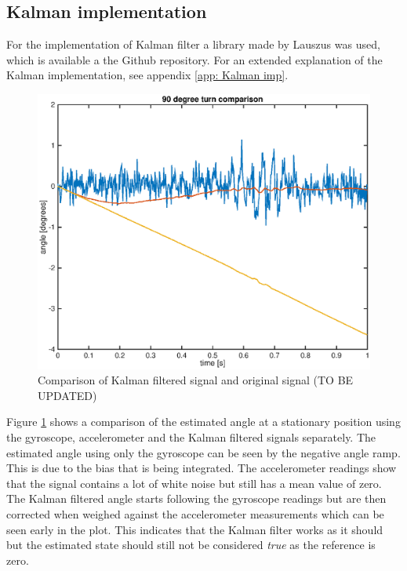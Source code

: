 \documentclass[a4paper,11pt]{kth-mag}
\begin{document}
\subsection{Kalman implementation}
For the implementation of Kalman filter a library made by Lauszus was used, which is available a the Github repository\cite{TKJkalman}. For an extended explanation of the Kalman implementation, see appendix \ref{app: Kalman imp}.

\begin{figure}[!htb]
\centering
\includegraphics[scale=0.6]{Kalmancomparisonstat.eps}
\caption{Comparison of Kalman filtered signal and original signal (TO BE UPDATED)}
\label{Fig: Kalman comparison}
\end{figure}
Figure \ref{Fig: Kalman comparison} shows a comparison of the estimated angle at a stationary position using the gyroscope, accelerometer and the Kalman filtered signals separately. The estimated angle using only the gyroscope can be seen by the negative angle ramp. This is due to the bias that is being integrated. The accelerometer readings show that the signal contains a lot of white noise but still has a mean value of zero. 
The Kalman filtered angle starts following the gyroscope readings but are then corrected when weighed against the accelerometer measurements which can be seen early in the plot. 
This indicates that the Kalman filter works as it should but the estimated state should still not be considered \textit{true} as the reference is zero. 
\end{document}
